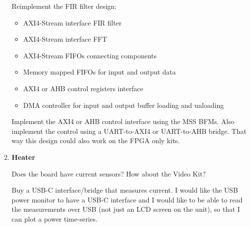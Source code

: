 \begin{enumerate}
Reimplement the FIR filter design:
\begin{itemize}
\item AXI4-Stream interface FIR filter
\item AXI4-Stream interface FFT
\item AXI4-Stream FIFOs connecting components
\item Memory mapped FIFOs for input and output data
\item AXI4 or AHB control registers interface
\item DMA controller for input and output buffer loading and unloading
\end{itemize}
%
Implement the AXI4 or AHB control interface using the MSS BFMs.
Also implement the control using a UART-to-AXI4 or UART-to-AHB bridge.
That way this design could also work on the FPGA only kits.

\item \textbf{Heater}

Does the board have current sensors? How about the Video Kit?

Buy a USB-C interface/bridge that measures current. I would like the USB power
monitor to have a USB-C interface and I would like to be able to read the
measurements over USB (not just an LCD screen on the unit), so that I can
plot a power time-series.

\end{enumerate}


